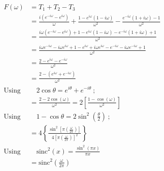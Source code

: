 \documentclass[preview]{standalone}
\begin{document}
\begin{align*}
F(\omega)&=T_{1}+T_{2}-T_{3} \\ &=\frac{i(e^{-i\omega}-e^{i\omega})}{\omega}+\frac{1-e^{i\omega}(1-i\omega)}{\omega^{2}}-\frac{e^{-i\omega}(1+i\omega)-1}{\omega^{2}} \\ &=\frac{i\omega(e^{-i\omega}-e^{i\omega})+1-e^{i\omega}(1-i\omega)-e^{-i\omega}(1+i\omega)+1}{\omega^{2}} \\ &=\frac{i\omega e^{-i\omega}-i\omega e^{i\omega}+1-e^{i\omega}+i\omega e^{i\omega}-e^{-i\omega}-i\omega e^{-i\omega}+1}{\omega^{2}} \\ &=\frac{2-e^{i\omega} - e^{-i\omega}}{\omega^{2}} \\ &=\frac{2-(e^{i\omega}+e^{-i\omega})}{\omega^{2}} \quad \\ \textrm{Using}& \quad 2\cos{\theta}=e^{i\theta}+e^{-i\theta} \ ; \\ &=\frac{2-2\cos{(\omega)}}{\omega^{2}} = 2\left[\frac{1-\cos{(\omega)}}{\omega^{2}}\right] \\ \textrm{Using}& \quad 1-\cos{\theta}=2\sin^{2}{\left( \frac{\theta}{2} \right) } \ ; \\ &=4\left\{ \frac{\sin^{2}{\left[ \pi \left( \frac{\omega}{2\pi} \right) \right]}}{4\left[ \pi \left( \frac{\omega}{2\pi} \right) \right]^{2} } \right\} \\ \textrm{Using}& \quad \textrm{sinc}^{2}(x)=\frac{\sin^{2}{(\pi x)}}{\pi x} \\ &=\textrm{sinc}^{2}\left( \frac{\omega}{2\pi} \right)
\end{align*}
\end{document}
